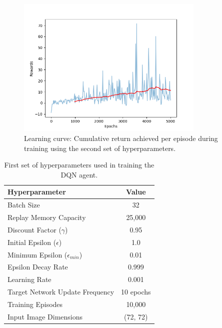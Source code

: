 \documentclass[a4paper,12pt]{article}
\begin{document}
\begin{figure}[ht!]
    \centering
    \includegraphics[width=0.8\textwidth]{first_run.png} 
    \caption{Learning curve: Cumulative return achieved per episode during training using the second set of hyperparameters.}
    \label{fig:learning_curve}
\end{figure}

\begin{table}[ht!]
    \centering
    \begin{tabular}{|l|c|}
        \hline
        \textbf{Hyperparameter} & \textbf{Value} \\
        \hline
        Batch Size & 32 \\
        \rowcolor{lime}
        Replay Memory Capacity & 25,000 \\
        Discount Factor ($\gamma$) & 0.95 \\
        Initial Epsilon ($\epsilon$) & 1.0 \\
        Minimum Epsilon ($\epsilon_{min}$) & 0.01 \\
        Epsilon Decay Rate & 0.999 \\
        Learning Rate & 0.001 \\
        \rowcolor{lime}
        Target Network Update Frequency & 10 epochs \\
        Training Episodes & 10,000 \\
        Input Image Dimensions & (72, 72) \\
        \hline
    \end{tabular}
    \caption{First set of hyperparameters used in training the DQN agent.}
    \label{tab:hyperparameters2}
\end{table}
\end{document}
